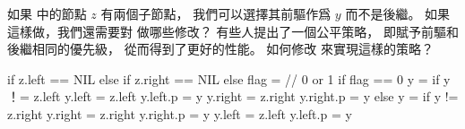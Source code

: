 \startEXERCISE
如果  中的節點 $z$ 有兩個子節點，
我們可以選擇其前驅作爲 $y$ 而不是後繼。
如果這樣做，我們還需要對  做哪些修改？
有些人提出了一個公平策略，
即賦予前驅和後繼相同的優先級，
從而得到了更好的性能。
如何修改  來實現這樣的策略？
\stopEXERCISE

\startANSWER
{}
\startCLRSCODE
if z.left == NIL
else if z.right == NIL
else
	flag = 		// 0 or 1
	if flag == 0
		y = 
		if y ！= z.left
			y.left = z.left
			y.left.p = y
		y.right = z.right
		y.right.p = y
	else
		y = 
		if y != z.right
			y.right = z.right
			y.right.p = y
		y.left = z.left
		y.left.p = y
\stopCLRSCODE
\stopANSWER
